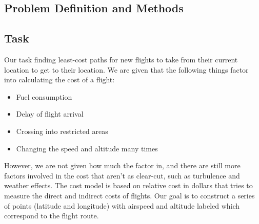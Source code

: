 \documentclass{article}[12pt]
\begin{document}
\begin{multicols}{2}
\section{Problem Definition and Methods}

\subsection{Task}
Our task finding least-cost paths for new flights to take from their current location to get to their location. We are given that the following things factor into calculating the cost of a flight:
	\begin{itemize}
		\item Fuel consumption
		\item Delay of flight arrival
		\item Crossing into restricted areas
		\item Changing the speed and altitude many times
	\end{itemize}
However, we are not given how much the factor in, and there are still more factors involved in the cost that aren't as clear-cut, such as turbulence and weather effects. The cost model is based on relative cost in dollars that tries to measure the direct and indirect costs of flights. Our goal is to construct a series of points (latitude and longitude) with airspeed and altitude labeled which correspond to the flight route.\\


\end{multicols}
\end{document}
